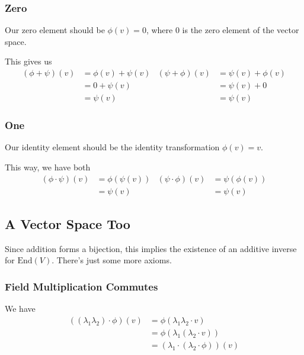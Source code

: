 \documentclass[12pt]{article}
\begin{document}
\subsubsection{Zero}

Our zero element should be $\phi(v)=0$, where $0$ is the zero element of the vector space.

This gives us
\begin{align*}
  (\phi + \psi)(v) & = \phi(v)+\psi(v) & (\psi + \phi)(v) & = \psi(v)+\phi(v) \\
                   & = 0+\psi(v)       &                  & = \psi(v)+0       \\
                   & = \psi(v)         &                  & = \psi(v)
\end{align*}

\subsubsection{One}

Our identity element should be the identity transformation $\phi(v)=v$.

This way, we have both
\begin{align*}
  (\phi \cdot \psi)(v) & = \phi(\psi(v)) & (\psi \cdot \phi)(v) & = \psi(\phi(v)) \\
                       & = \psi(v)       &                      & = \psi(v)
\end{align*}

\subsection{A Vector Space Too}

Since addition forms a bijection, this implies the existence of an
additive inverse for $\mathrm{End}(V)$.
There's just some more axioms.

\subsubsection{Field Multiplication Commutes}

We have
\begin{align*}
  ((\lambda_1 \lambda_2) \cdot \phi)(v)
   & = \phi(\lambda_1\lambda_2 \cdot v)            \\
   & = \phi(\lambda_1(\lambda_2 \cdot v))          \\
   & = (\lambda_1 \cdot (\lambda_2 \cdot \phi))(v)
\end{align*}
\end{document}
